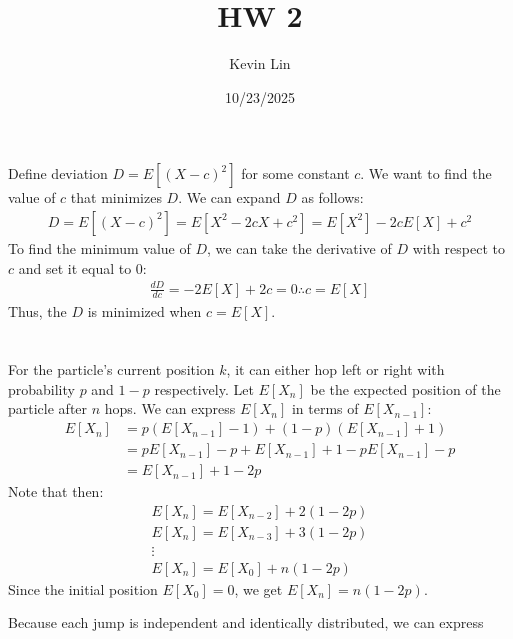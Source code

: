 \documentclass[11pt,a4paper,margin=1in]{article}
\title{HW 2}
\author{Kevin Lin}
\date{10/23/2025}
\begin{document}
\maketitle
\section{}
    Define deviation $D = E[(X - c)^2]$ for some constant $c$. We want to find
    the value of $c$ that minimizes $D$. We can expand $D$ as follows:
    \begin{gather*}
        D = E[(X - c)^2] = E[X^2 - 2cX + c^2] = E[X^2] - 2cE[X] + c^2
    \end{gather*}
    To find the minimum value of $D$, we can take the derivative of $D$
    with respect to $c$ and set it equal to 0:
    \begin{gather*}
        \frac{dD}{dc} = -2E[X] + 2c = 0 \therefore c = E[X]
    \end{gather*}
    Thus, the $D$ is minimized when $c = E[X]$.

\section{}
    For the particle's current position $k$, it can either hop left or right with
    probability $p$ and $1 - p$ respectively. Let $E[X_n]$ be the expected position
    of the particle after $n$ hops. We can express $E[X_n]$ in terms of $E[X_{n-1}]$:
    \begin{align*}
        E[X_n] &= p(E[X_{n-1}] - 1) + (1 - p)(E[X_{n-1}] + 1) \\
        &= pE[X_{n - 1}] - p + E[X_{n - 1}] + 1 - pE[X_{n - 1}] - p \\
        &= E[X_{n - 1}] + 1 - 2p
    \end{align*}
    Note that then:
    \begin{gather*}
        E[X_n] = E[X_{n-2}] + 2(1 - 2p)\\
        E[X_n] = E[X_{n-3}] + 3(1 - 2p)\\
        \vdots\\
        E[X_n] = E[X_0] + n(1 - 2p)
    \end{gather*}
    Since the initial position $E[X_0] = 0$, we get $E[X_n] = n(1 - 2p)$.
    
    \vspace{10pt}
    \noindent Because each jump is independent and identically distributed, we can express
\end{document}

